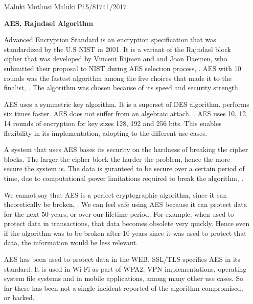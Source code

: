 \documentclass{article}
\begin{document}
Maluki Muthusi Maluki
\newline
P15/81741/2017

\begin{center}
    \textbf{AES, Rajndael Algorithm}
\end{center}

Advanced Encryption Standard is an encryption specification that was standardized by the U.S NIST in 2001. It is a variant of the Rajndael block cipher that was developed by Vincent Rijmen and and Joan Daemen, who submitted their proposal to NIST during AES selection process, \citep{Daemen2002}. AES with 10 rounds was the fastest algorithm among the five choices that made it to the finalist, \citep[p.~9]{Schneier2000}. The algorithm was chosen because of its speed and security strength.

AES uses a symmetric key algorithm. It is a superset of DES algorithm, performs six times faster. AES does not suffer from an algebraic attach, \citep{ferguson}. AES uses 10, 12, 14 rounds of encryption for key sizes 128, 192 and 256 bits. This enables flexibility in its implementation, adopting to the different use cases.

A system that uses AES bases its security on the hardness of breaking the cipher  blocks. The larger the cipher block the harder the problem, hence the more secure the system is. The data is guranteed to be secure over a certain period of time, due to computational power limitations required to break the algorithm, \citep{website:GeorgeOu}.

We cannot say that AES is a perfect cryptographic algorithm, since it can theoretically be broken, \citep{Schneier2000}. We can feel safe using AES because it can protect data for the next 50 years, or over our lifetime period. For example, when used to protect data in transactions, that data becomes obsolete very quickly. Hence even if the algorithm was to be broken after 10 years since it was used to protect that data, the information would be less relevant.

AES has been used to protect data in the WEB. SSL/TLS specifies AES in its standard. It is used in Wi-Fi as part of WPA2, VPN implementations, operating system file systems and in mobile applications, among many other use cases. So far there has been not a single incident reported of the algorithm compromised, or hacked.




\end{document}
